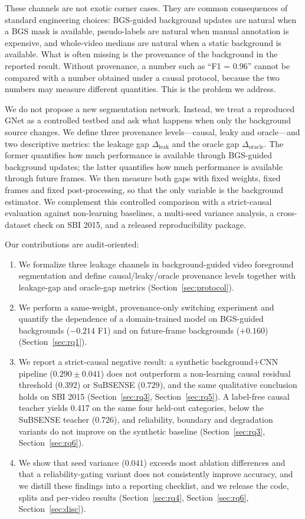 \documentclass[sn-mathphys-num,iicol]{sn-jnl}
\begin{document}
These channels are not exotic corner cases. They are common consequences of
standard engineering choices: BGS-guided background updates are natural when a
BGS mask is available, pseudo-labels are natural when manual annotation is
expensive, and whole-video medians are natural when a static background is
available. What is often missing is the provenance of the background in the
reported result. Without provenance, a number such as ``F1 = 0.96'' cannot be
compared with a number obtained under a causal protocol, because the two numbers
may measure different quantities. This is the problem we address.

We do not propose a new segmentation network. Instead, we treat a reproduced
GNet as a controlled testbed and ask what happens when only the background
source changes. We define three provenance levels---causal, leaky and
oracle---and two descriptive metrics: the leakage gap $\Delta_{\mathrm{leak}}$
and the oracle gap $\Delta_{\mathrm{oracle}}$. The former quantifies how much
performance is available through BGS-guided background updates; the latter
quantifies how much performance is available through future frames. We then
measure both gaps with fixed weights, fixed frames and fixed post-processing, so
that the only variable is the background estimator. We complement this
controlled comparison with a strict-causal evaluation against non-learning
baselines, a multi-seed variance analysis, a cross-dataset check on SBI 2015,
and a released reproducibility package.

Our contributions are audit-oriented:
\begin{enumerate}
\item We formalize three leakage channels in background-guided video foreground
segmentation and define causal/leaky/oracle provenance levels together with
leakage-gap and oracle-gap metrics (Section~\ref{sec:protocol}).
\item We perform a same-weight, provenance-only switching experiment and
quantify the dependence of a domain-trained model on BGS-guided backgrounds
($-0.214$ F1) and on future-frame backgrounds ($+0.160$) (Section~\ref{sec:rq1}).
\item We report a strict-causal negative result: a synthetic
background+CNN pipeline ($0.290\pm0.041$) does not outperform a non-learning
causal residual threshold ($0.392$) or SuBSENSE ($0.729$), and the same
qualitative conclusion holds on SBI 2015 (Section~\ref{sec:rq3},
Section~\ref{sec:rq5}). A label-free causal teacher yields 0.417 on the same
four held-out categories, below the SuBSENSE teacher (0.726), and reliability,
boundary and degradation variants do not improve on the synthetic baseline
(Section~\ref{sec:rq3}, Section~\ref{sec:rq6}).
\item We show that seed variance ($0.041$) exceeds most ablation differences and
that a reliability-gating variant does not consistently improve accuracy, and we distill these
findings into a reporting checklist, and we release the code, splits and
per-video results (Section~\ref{sec:rq4}, Section~\ref{sec:rq6},
Section~\ref{sec:disc}).
\end{enumerate}
\end{document}
